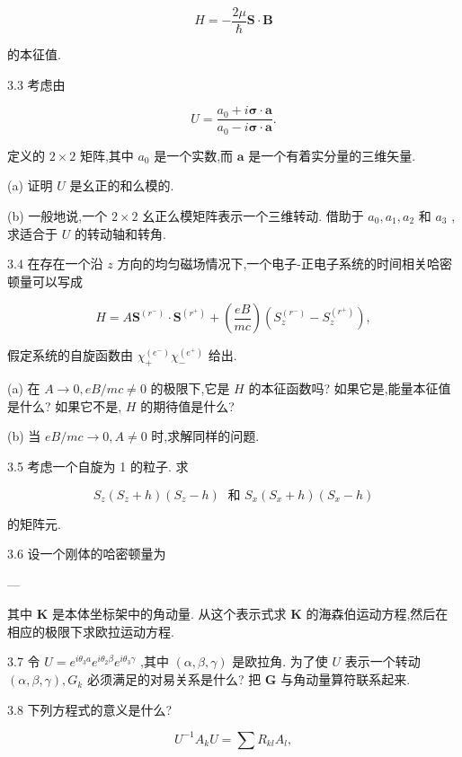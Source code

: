 $$
H = - \frac{2\mu }{\hslash }\mathbf{S} \cdot \mathbf{B}
$$

的本征值.

3.3 考虑由

$$
U = \frac{{a}_{0} + i\mathbf{\sigma } \cdot \mathbf{a}}{{a}_{0} - i\mathbf{\sigma } \cdot \mathbf{a}}.
$$

定义的 $2 \times 2$ 矩阵,其中 ${a}_{0}$ 是一个实数,而 $\mathbf{a}$ 是一个有着实分量的三维矢量.

(a) 证明 $U$ 是幺正的和么模的.

(b) 一般地说,一个 $2 \times 2$ 幺正么模矩阵表示一个三维转动. 借助于 ${a}_{0},{a}_{1},{a}_{2}$ 和 ${a}_{3}$ ,求适合于 $U$ 的转动轴和转角.

3.4 在存在一个沿 $z$ 方向的均匀磁场情况下,一个电子-正电子系统的时间相关哈密顿量可以写成

$$
H = A{\mathbf{S}}^{\left( {r}^{ - }\right) } \cdot {\mathbf{S}}^{\left( {r}^{ + }\right) } + \left( \frac{eB}{mc}\right) \left( {{S}_{z}^{\left( {r}^{ - }\right) } - {S}_{z}^{\left( {r}^{ + }\right) }}\right) ,
$$

假定系统的自旋函数由 ${\chi }_{ + }^{\left( {e}^{ - }\right) }{\chi }_{ - }^{\left( {e}^{ + }\right) }$ 给出.

(a) 在 $A \rightarrow 0,{eB}/{mc} \neq 0$ 的极限下,它是 $H$ 的本征函数吗? 如果它是,能量本征值是什么? 如果它不是, $H$ 的期待值是什么?

(b) 当 ${eB}/{mc} \rightarrow 0, A \neq 0$ 时,求解同样的问题.

3.5 考虑一个自旋为 1 的粒子. 求

$$
{S}_{z}\left( {{S}_{z} + h}\right) \left( {{S}_{z} - h}\right) \;\text{ 和 }{S}_{x}\left( {{S}_{x} + h}\right) \left( {{S}_{x} - h}\right)
$$

的矩阵元.

3.6 设一个刚体的哈密顿量为

---

其中 $\mathbf{K}$ 是本体坐标架中的角动量. 从这个表示式求 $\mathbf{K}$ 的海森伯运动方程,然后在相应的极限下求欧拉运动方程.

3.7 令 $U = {e}^{i{\theta }_{3}a}{e}^{i{\theta }_{2}\beta }{e}^{i{\theta }_{3}\gamma }$ ,其中 $\left( {\alpha ,\beta ,\gamma }\right)$ 是欧拉角. 为了使 $U$ 表示一个转动 $\left( {\alpha ,\beta ,\gamma }\right) ,{G}_{k}$ 必须满足的对易关系是什么? 把 $\mathbf{G}$ 与角动量算符联系起来.

3.8 下列方程式的意义是什么?

$$
{U}^{-1}{A}_{k}U = \sum {R}_{kl}{A}_{l},
$$

